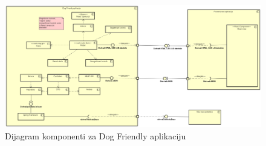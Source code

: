             \begin{figure}[H]
			    \includegraphics[width=\textwidth]{slike/Dijagram komponenti - Dog Friendly aplikacija.png} 
			        \caption{Dijagram komponenti za Dog Friendly aplikaciju}
			    \label{fig:Dijagram komponenti za Dog Friendly aplikaciju}
		    \end{figure}